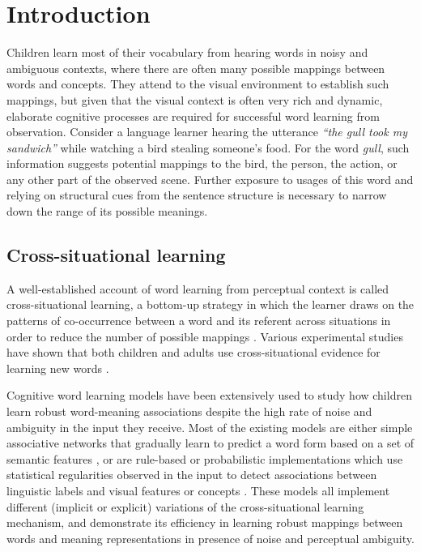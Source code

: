 \section{Introduction}

Children learn most of their vocabulary from hearing words in noisy
and ambiguous contexts, where there are often many possible mappings
between words and concepts. They attend to the visual environment to
establish such mappings, but given that the visual context is often
very rich and dynamic, elaborate cognitive processes are required for
successful word learning from observation. Consider a language learner
hearing the utterance {\it ``the gull took my sandwich''} while
watching a bird stealing someone's food. For the word {\it gull}, such
information suggests potential mappings to the bird, the person, the
action, or any other part of the observed scene. Further exposure to
usages of this word and relying on structural cues from the sentence structure
is necessary to narrow down the range of its possible meanings.

\subsection{Cross-situational learning}
A well-established account of word learning from perceptual context is
called cross-situational learning, a bottom-up strategy in which the
learner draws on the patterns of co-occurrence between a word and its
referent across situations in order to reduce the number of possible
mappings \cite{Quine1960,Carey1978,pinker.89}. Various experimental
studies have shown that both children and adults use cross-situational
evidence for learning new words
\cite{yu.smith.07,smith.yu.08,vouloumanos.08,vouloumanos.werker.09}.

Cognitive word learning models have been extensively used to study how
children learn robust word-meaning associations despite the high rate
of noise and ambiguity in the input they receive. Most of the existing
models are either simple associative networks that gradually learn to
predict a word form based on a set of semantic features
\cite{Li.etal.2004,regier.05}, or are rule-based or
probabilistic implementations which use statistical regularities
observed in the input to detect associations between linguistic labels
and visual features or concepts
\cite{siskind.96,frank.etal.07,yu.08,fazly.etal.10csj}.
These models all implement different (implicit or explicit) variations
of the cross-situational learning mechanism, and demonstrate its
efficiency in learning robust mappings between words and meaning
representations in presence of noise and perceptual ambiguity.

